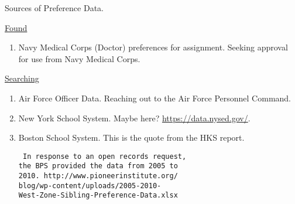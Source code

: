 Sources of Preference Data.

\underline{Found}

\begin{enumerate}

\item Navy Medical Corps (Doctor) preferences for assignment. Seeking approval for use from Navy Medical Corps.

\end{enumerate}

\underline{Searching}

\begin{enumerate}

\item Air Force Officer Data. Reaching out to the Air Force Personnel Command.

\item New York School System. Maybe here? \url{https://data.nysed.gov/}.

\item Boston School System. This is the quote from the HKS report. \begin{verbatim} In response to an open records request,
the BPS provided the data from 2005 to
2010. http://www.pioneerinstitute.org/
blog/wp-content/uploads/2005-2010-
West-Zone-Sibling-Preference-Data.xlsx
\end{verbatim}

\end{enumerate}